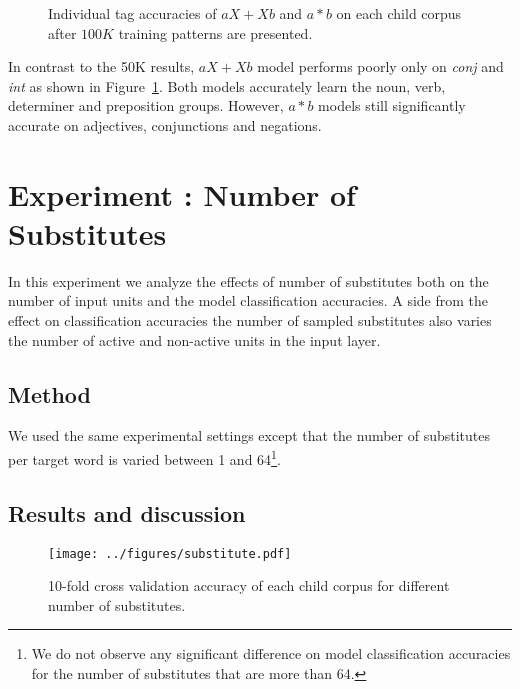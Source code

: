 \begin{figure}[h]
  \caption{Individual tag accuracies of $aX+Xb$ and $a*b$ on each child corpus
  after $100K$ training patterns are presented.}  
  \label{fig:category100K}
\end{figure}

In contrast to the 50K results, $aX+Xb$ model performs poorly only on {\it
conj} and {\it int} as shown in Figure~\ref{fig:category100K}.  Both models
accurately learn the noun, verb, determiner and preposition groups.  However,
$a*b$ models still significantly accurate on adjectives, conjunctions and
negations.

\section{Experiment : Number of Substitutes}
\label{s:exp_substitutes}
In this experiment we analyze the effects of number of substitutes both on the
number of input units and the model classification accuracies.  A side from the
effect on classification accuracies the number of sampled substitutes also
varies the number of active and non-active units in the input layer.  

\subsection{Method} 
We used the same experimental settings except that the number of substitutes
per target word is varied between 1 and 64\footnote{We do not observe any
significant difference on model classification accuracies for the number of
substitutes that are more than 64.}.

\subsection{Results and discussion}
\begin{figure}[ht]
  \centering
  \texttt{[image: ../figures/substitute.pdf]}
  \caption{10-fold cross validation accuracy of each child corpus for different
  number of substitutes.}
  \label{fig:substitutes}
\end{figure} 

